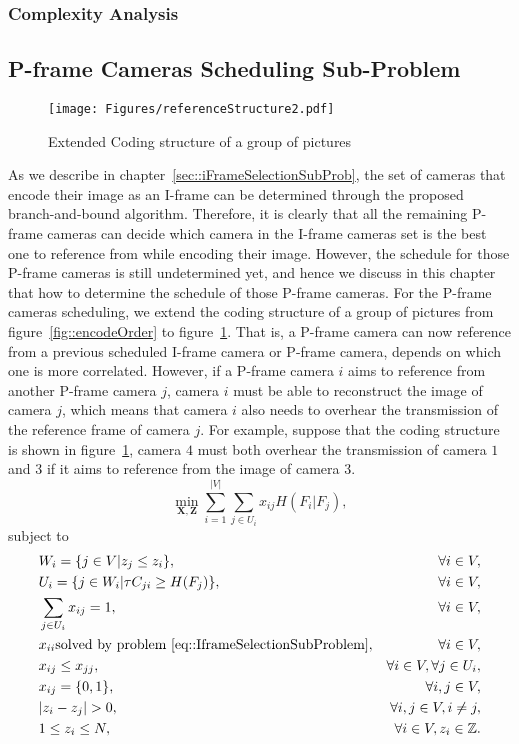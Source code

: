 \subsubsection{Complexity Analysis}
%
%
%
\subsection{P-frame Cameras Scheduling Sub-Problem}
%
\begin{figure}
\begin{center}
\texttt{[image: Figures/referenceStructure2.pdf]}
\caption{\label{fig::encodeOrder2}Extended Coding structure of a group of pictures}
\end{center}
\end{figure}
%
As we describe in chapter~\ref{sec::iFrameSelectionSubProb}, the set of cameras that encode their image as an I-frame can be determined through the proposed branch-and-bound algorithm.
Therefore, it is clearly that all the remaining P-frame cameras can decide which camera in the I-frame cameras set is the best one to reference from while encoding their image.
However, the schedule for those P-frame cameras is still undetermined yet, and hence we discuss in this chapter that how to determine the schedule of those P-frame cameras.
For the P-frame cameras scheduling, we extend the coding structure of a group of pictures from figure~\ref{fig::encodeOrder} to figure~\ref{fig::encodeOrder2}.
That is, a P-frame camera can now reference from a previous scheduled I-frame camera or P-frame camera, depends on which one is more correlated.
However, if a P-frame camera $i$ aims to reference from another P-frame camera $j$, camera $i$ must be able to reconstruct the image of camera $j$, which means that camera $i$ also needs to overhear the transmission of the reference frame of camera $j$.
For example, suppose that the coding structure is shown in figure~\ref{fig::encodeOrder2}, camera $4$ must both overhear the transmission of camera $1$ and $3$ if it aims to reference from the image of camera $3$.
%
\begin{equation*}
\underset{\mathbf{X}, \mathbf{Z}}{\min}
\sum_{i=1}^{|V|} \sum_{j \in U_i}  x_{ij} H(F_i|F_j),
\end{equation*}
subject to
\begin{align}
&W_i = \{ j \in V | z_j \leq z_i \}, &\forall i \in V, \nonumber \\
&U_i = \{ j \in W_i | \tau C_{ji} \geq H(F_j) \}, &\forall i \in V, \nonumber \\
&\sum_{j \in U_i} x_{ij} = 1, &\forall i \in V, \nonumber \\
&x_{ii} \text{solved by problem~\eqref{eq::IframeSelectionSubProblem}}, &\forall i \in V, \nonumber \\
&x_{ij} \leq x_{jj}, &\forall i \in V, \forall j \in U_i, \nonumber \\
&x_{ij} = \{0,1\}, &\forall i,j \in V, \nonumber \\
&|z_i - z_j| > 0, &\forall i,j \in V, i \neq j, \nonumber \\
&1 \leq z_i \leq N, &\forall i \in V, z_i \in \mathbb{Z}.
\label{eq::PframeSchedulingSubProblem}
\end{align}